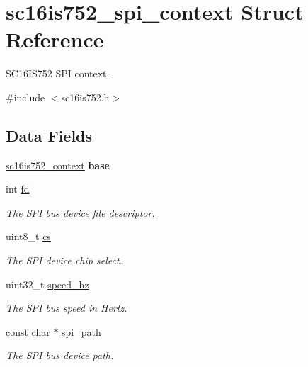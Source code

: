 \hypertarget{structsc16is752__spi__context}{}\section{sc16is752\+\_\+spi\+\_\+context Struct Reference}
\label{structsc16is752__spi__context}


S\+C16\+I\+S752 S\+PI context.  




{\ttfamily \#include $<$sc16is752.\+h$>$}

\subsection*{Data Fields}
\begin{DoxyCompactItemize}
\item 
\mbox{\label{structsc16is752__spi__context_a23a530b503182d781bc382f8adda29a3}} 
\mbox{\hyperlink{structsc16is752__context}{sc16is752\+\_\+context}} {\bfseries base}
\item 
int \mbox{\hyperlink{structsc16is752__spi__context_afa904b50c5cceaf418eaf5c74ca64f79}{fd}}
\begin{DoxyCompactList}\small\item\em The S\+PI bus device file descriptor. \end{DoxyCompactList}\item 
uint8\+\_\+t \mbox{\hyperlink{structsc16is752__spi__context_aeaff86716e33a8ed4ac9e99e2683b1c0}{cs}}
\begin{DoxyCompactList}\small\item\em The S\+PI device chip select. \end{DoxyCompactList}\item 
uint32\+\_\+t \mbox{\hyperlink{structsc16is752__spi__context_a3a8b236916a9afd88fcf66ea32868d27}{speed\+\_\+hz}}
\begin{DoxyCompactList}\small\item\em The S\+PI bus speed in Hertz. \end{DoxyCompactList}\item 
const char $\ast$ \mbox{\hyperlink{structsc16is752__spi__context_a02663178c14e331d10f19e0d01e40d3f}{spi\+\_\+path}}
\begin{DoxyCompactList}\small\item\em The S\+PI bus device path. \end{DoxyCompactList}\end{DoxyCompactItemize}


